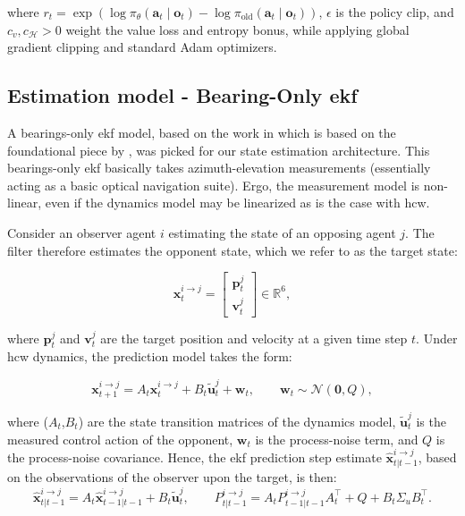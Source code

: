 where \(r_t=\exp\!\left(\log\pi_\theta(\mathbf{a}_t \mid \mathbf{o}_t)-\log\pi_{\mathrm{old}}(\mathbf{a}_t \mid \mathbf{o}_t)\right)\),
\(\epsilon\) is the policy clip, and \(c_v,c_{\mathcal{H}}>0\) weight the value loss and entropy bonus, while applying global gradient clipping and standard Adam optimizers.


\subsection{Estimation model - Bearing-Only \acs{ekf}}
\label{sec:estimation-model-ekf}

A bearings-only \acs{ekf} model, based on the work in \cite{aidala1979kalman} which is based on the foundational piece by \cite{kalman1960new}, was picked for our state estimation architecture. This bearings-only \acs{ekf} basically takes azimuth-elevation measurements (essentially acting as a basic optical navigation suite). Ergo, the measurement model is non-linear, even if the dynamics model may be linearized as is the case with \acs{hcw}. 

Consider an observer agent $i$ estimating the state of an opposing agent $j$. The filter therefore estimates the opponent state, which we refer to as the target state:

\[
\mathbf{x}^{i\to j}_t =
\begin{bmatrix}
\mathbf{p}^{j}_t\\[2pt]
\mathbf{v}^{j}_t
\end{bmatrix}
\in \mathbb{R}^6,
\]

where $\mathbf{p}^{j}_t$ and $\mathbf{v}^{j}_t$ are the target position and velocity at a given time step $t$. Under \acs{hcw} dynamics, the prediction model takes the form:

\[
\mathbf{x}^{i\to j}_{t+1} = A_t\mathbf{x}^{i\to j}_{t} + B_t\tilde{\mathbf{u}}^{j}_{t} + \mathbf{w}_t,
\qquad
\mathbf{w}_t \sim \mathcal{N}(\mathbf{0},Q),
\]

where ($A_t$,$B_t$) are the state transition matrices of the dynamics model, $\tilde{\mathbf{u}}^{j}_{t}$ is the measured control action of the opponent, $\mathbf{w}_t$ is the process-noise term, and $Q$ is the process-noise covariance. Hence, the \acs{ekf} prediction step estimate $\hat{\mathbf{x}}^{i\to j}_{t|t-1}$, based on the observations of the observer upon the target, is then:
\[
\hat{\mathbf{x}}^{i\to j}_{t|t-1} = A_t\hat{\mathbf{x}}^{i\to j}_{t-1|t-1} + B_t\tilde{\mathbf{u}}^{j}_{t},
\qquad
P^{i\to j}_{t|t-1} = A_t P^{i\to j}_{t-1|t-1}A_t^\top + Q + B_t\Sigma_u B_t^\top.
\]

